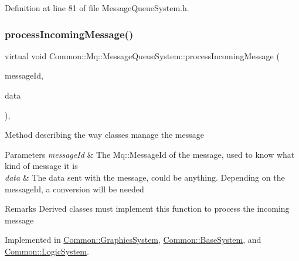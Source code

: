 Definition at line 81 of file Message\+Queue\+System.\+h.

\mbox{\label{class_common_1_1_mq_1_1_message_queue_system_ad6eb849b72f03e3e4f09c6457c8ecda6}} 
\subsubsection{\texorpdfstring{process\+Incoming\+Message()}{processIncomingMessage()}}
{\footnotesize\ttfamily virtual void Common\+::\+Mq\+::\+Message\+Queue\+System\+::process\+Incoming\+Message (\begin{DoxyParamCaption}\item[{\hyperlink{group___common_gaa8c87d2b450282716c906da283e149e6}{Mq\+::\+Message\+Id}}]{message\+Id,  }\item[{const void $\ast$}]{data }\end{DoxyParamCaption})\hspace{0.3cm}{\ttfamily [protected]}, {}}

Method describing the way classes manage the message 
\begin{DoxyParams}{Parameters}
{\em message\+Id} & The Mq\+::\+Message\+Id of the message, used to know what kind of message it is \\
\hline
{\em data} & The data sent with the message, could be anything. Depending on the message\+Id, a conversion will be needed \\
\hline
\end{DoxyParams}
\begin{DoxyRemark}{Remarks}
Derived classes must implement this function to process the incoming message 
\end{DoxyRemark}


Implemented in \hyperlink{class_common_1_1_graphics_system_a8d286a151ed9a65f0eebe1ac119e2d59}{Common\+::\+Graphics\+System}, \hyperlink{class_common_1_1_base_system_a6820dfed1ee63f376e5773b361e3d2a8}{Common\+::\+Base\+System}, and \hyperlink{class_common_1_1_logic_system_a4495ecadf034103ad58deab6802543fa}{Common\+::\+Logic\+System}.

\mbox{\label{class_common_1_1_mq_1_1_message_queue_system_abc956172e5948e71547202f429e5e505}} 
